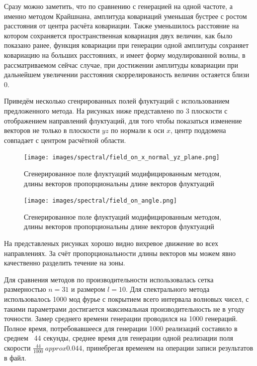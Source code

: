 Сразу можно заметить, что по сравнению с генерацией на одной частоте, а именно методом Крайшнана, амплитуда ковариаций уменьшая бустрее с ростом расстояния от центра расчёта ковариации. Также уменьшилось расстояние на котором сохраняется пространственная ковариация двух величин, как было показано ранее, функция ковариации при генерации одной амплитуды сохраняет ковариацию на больших расстояниях, и имеет форму модулированной волны, в рассматриваемом сейчас случае, при достижении амплитуды ковариации при дальнейшем увеличении расстояния скоррелированость величин остаяется близи 0.

Приведём несколько сгенрированных полей флуктуаций с использованием предложенного метода. На рисунках ниже представлено по 3 плоскости с отображением направлений флуктуаций, для того чтобы показаться изменение векторов не только в плоскости $yz$ по нормали к оси $x$, центр поддомена совпадает с центром расчётной области.


\begin{figure}[ht] 
    \center
    \texttt{[image: images/spectral/field\_on\_x\_normal\_yz\_plane.png]}
    \caption{Сгенерированное поле флуктуаций модифицированным методом, длины векторов пропорциональны длине векторов флуктуаций} 
    \label{img:spectral_result_field_no_angle}  
\end{figure}

\begin{figure}[ht] 
    \center
    \texttt{[image: images/spectral/field\_on\_angle.png]}
    \caption{Сгенерированное поле флуктуаций модифицированным методом, длины векторов пропорциональны длине векторов флуктуаций} 
    \label{img:spectral_result_field_on_angle}  
\end{figure}

На представленых рисунках хорошо видно вихревое движение во всех направлениях. За счёт пропорциональности длины векторов мы можем явно качественно разделить течение на зоны. 

Для сравнения методов по производительности использовалась сетка размерностью $n = 31$ и размером $l=10$. Для спектрального метода использовалось 1000 мод фурье с покрытием всего интервала волновых чисел, с такими параметрами достигается максимальная производительность не в угоду точности. Замер среднего времени генерации проводился на 1000 генераций. Полное время, потребовавшееся для генерации 1000 реализаций составило в среднем ~44 секунды, среднее время для генерации одной реализации поля скорости $\frac{44}{1000} \ approx 0.044$, принебрегая временем на операции записи результатов в файл.

